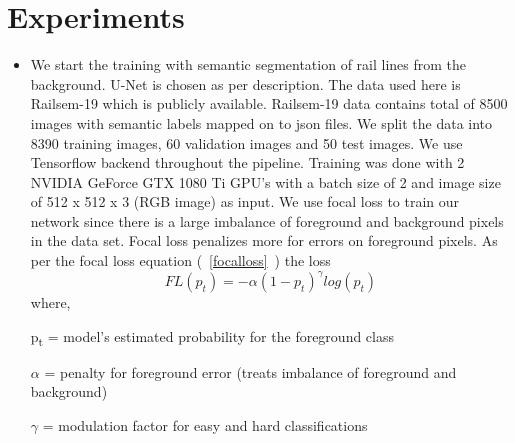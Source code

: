 \documentclass[conference]{IEEEtran}
\begin{document}
\section{Experiments}
\begin{itemize}
\item We start the training with semantic segmentation of rail lines from the background. U-Net is chosen as per \cite{ronneberger2015unet} description. The data used here is Railsem-19 \cite{9025646}  which is publicly available. Railsem-19 data contains total of 8500 images with semantic labels mapped on to json files. We split the data into 8390 training images, 60 validation images and 50 test images. We use Tensorflow \cite{tensorflow2015-whitepaper} backend throughout the pipeline. Training was done with 2 NVIDIA GeForce GTX 1080 Ti GPU's with a batch size of 2 and image size of 512 x 512 x 3 (RGB image) as input. We use focal loss \cite{lin2018focal} to train our network since there is a large imbalance of foreground and background pixels in the data set. Focal loss penalizes more for errors on foreground pixels. As per the focal loss equation  (~\ref{focalloss}~) the loss
\begin{equation}\label{focalloss}
    FL(p_{t})=-\alpha( 1 - p_{t})^{\gamma}log(p_{t})
\end{equation}
 where,
 
 p\textsubscript{t} = model's estimated probability for the foreground class
 
 
 $\alpha$ = penalty for foreground error (treats imbalance of foreground and background)
 
 
 $\gamma$ = modulation factor for easy and hard classifications
 

\end{itemize}
\end{document}
